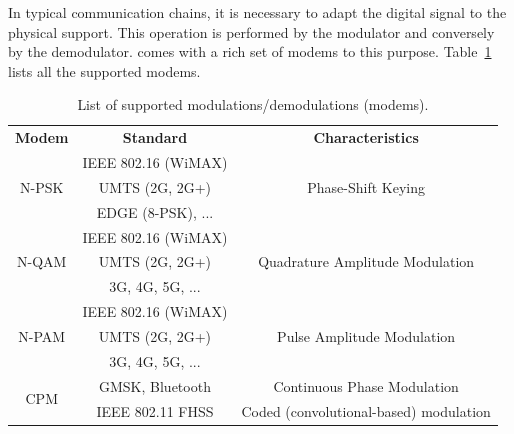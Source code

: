 In typical communication chains, it is necessary to adapt the digital signal
to the physical support. This operation is performed by the modulator and
conversely by the demodulator. \AFFECT comes with a rich set of modems to this
purpose. Table~\ref{tab:lib_modems} lists all the supported modems.

\begin{table}[htp]
  \centering
  \caption{List of supported modulations/demodulations (modems).}
  \label{tab:lib_modems}
  \begin{tabular}{ c | c | c }
  \multirow{2}{*}{\textbf{Modem}} & \multirow{2}{*}{\textbf{Standard}} & \multirow{2}{*}{\textbf{Characteristics}} \\
                                  &                                    &                                           \\
  \hline
  \hline
  \multirow{3}{*}{{N-PSK}}        & IEEE 802.16 (WiMAX)                &                                           \\
                                  & UMTS (2G, 2G+)                     & Phase-Shift Keying                        \\
                                  & EDGE (8-PSK), ...                  &                                           \\
  \hline
  \multirow{3}{*}{{N-QAM}}        & IEEE 802.16 (WiMAX)                &                                           \\
                                  & UMTS (2G, 2G+)                     & Quadrature Amplitude Modulation           \\
                                  & 3G, 4G, 5G, ...                    &                                           \\
  \hline
  \multirow{3}{*}{{N-PAM}}        & IEEE 802.16 (WiMAX)                &                                           \\
                                  & UMTS (2G, 2G+)                     & Pulse Amplitude Modulation                \\
                                  & 3G, 4G, 5G, ...                    &                                           \\
  \hline
  \multirow{2}{*}{{CPM}}          & GMSK, Bluetooth                    & Continuous Phase Modulation               \\
                                  & IEEE 802.11 FHSS                   & Coded (convolutional-based) modulation    \\

\end{tabular}
\end{table}
